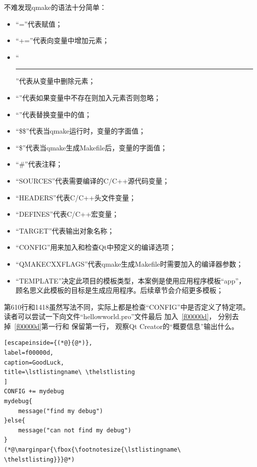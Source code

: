 不难发现qmake的语法十分简单：
\begin{itemize}
\item “{\sourcefonttwo{}=}”代表赋值；
\item “{\sourcefonttwo{}+}{\sourcefonttwo{}=}”代表向变量中增加元素；
\item “\hspace{0.05em}\rule[0.7ex]{0.4em}{0.65pt}\hspace{0.05em}{\sourcefonttwo{}=}”代表从变量中删除元素；
\item “\raisebox{-0.35ex}{\sourcefonttwo{}*}{\sourcefonttwo{}=}”代表如果变量中不存在则加入元素否则忽略；
\item “\raisebox{0.16ex}{\sourcefonttwo\~{}}{\sourcefonttwo{}=}”代表替换变量中的值；
\item “{\sourcefonttwo\$}{\sourcefonttwo\$}”代表当qmake运行时，变量的字面值；
\item “{\sourcefonttwo\$}”代表当qmake生成Makefile后，变量的字面值；
\item “{\sourcefonttwo\#}”代表注释；
\item “SOURCES”代表需要编译的C/C{\sourcefonttwo{}+}{\sourcefonttwo{}+}源代码变量；
\item “HEADERS”代表C/C{\sourcefonttwo{}+}{\sourcefonttwo{}+}头文件变量；
\item “DEFINES”代表C/C{\sourcefonttwo{}+}{\sourcefonttwo{}+}宏变量；
\item “TARGET”代表输出对象名称；
\item “CONFIG”用来加入和检查Qt中预定义的编译选项；
\item “QMAKE\underline{\hspace{0.5em}}CXXFLAGS”代表qmake生成Makefile时需要加入的编译器参数；
\item “TEMPLATE”决定此项目的模板类型，本案例是使用应用程序模板“app”，
顾名思义此模板的目标是生成应用程序。后续章节会介绍更多模板；
\end{itemize}

第6\raisebox{0.16ex}{\sourcefonttwo\~{}}10行和14\raisebox{0.16ex}{\sourcefonttwo\~{}}18虽然写法不同，实际上都是检查“CONFIG”中是否定义了特定项。
读者可以尝试一下向文件“hellow\underline{\hspace{0.5em}}world.pro”文件最后
加入\lstlistingname\ \ref{f00000d}，
分别去掉\lstlistingname\ \ref{f00000d}第一行和
保留第一行，
观察Qt Creator的“概要信息”输出什么。
\FloatBarrier
\begin{lstlisting}[escapeinside={(*@}{@*)},
label=f00000d,
caption=GoodLuck,
title=\lstlistingname\ \thelstlisting
]
CONFIG += mydebug
mydebug{
    message("find my debug")
}else{
    message("can not find my debug")
}
(*@\marginpar{\fbox{\footnotesize{\lstlistingname\ \thelstlisting}}}@*)\end{lstlisting}          %




